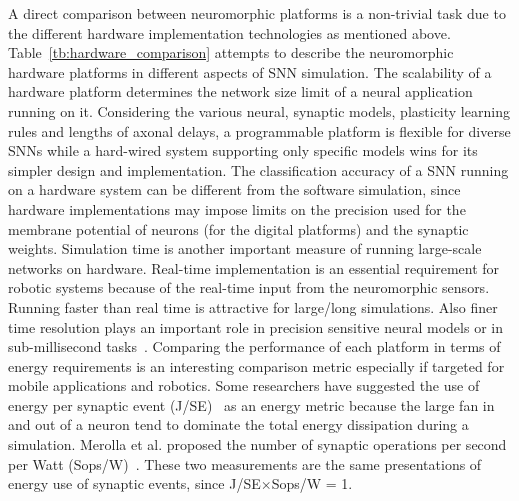 \documentclass{frontiersENG} %
\begin{document}
A direct comparison between neuromorphic platforms is a non-trivial task due to the different hardware implementation technologies as mentioned above.
Table~\ref{tb:hardware_comparison} attempts to describe the neuromorphic hardware platforms in different aspects of SNN simulation.
The scalability of a hardware platform determines the network size limit of a neural application running on it.
Considering the various neural, synaptic models, plasticity learning rules and lengths of axonal delays, a programmable platform is flexible for diverse SNNs while a hard-wired system supporting only specific models wins for its simpler design and implementation.
The classification accuracy of a SNN running on a hardware system can be different from the software simulation, since hardware implementations may impose limits on the precision used for the membrane potential of neurons (for the digital platforms) and the synaptic weights.
Simulation time is another important measure of running large-scale networks on hardware.
Real-time implementation is an essential requirement for robotic systems because of the real-time input from the neuromorphic sensors.
Running faster than real time is attractive for large/long simulations.
Also finer time resolution plays an important role in precision sensitive neural models or in sub-millisecond tasks~\citep{lagorce2015breaking}.
Comparing the performance of each platform in terms of energy requirements is an interesting comparison metric especially if targeted for mobile applications and robotics.
Some researchers have suggested the use of energy per synaptic event (J/SE)~\citep{sharp2012power,stromatias2013power} as an energy metric because the large fan in and out of a neuron tend to dominate the total energy dissipation during a simulation.
Merolla et al. proposed the number of synaptic operations per second per Watt (Sops/W)~\citep{merolla2014million}.
These two measurements are the same presentations of energy use of synaptic events, since J/SE$\times$Sops/W = 1.
\end{document}
